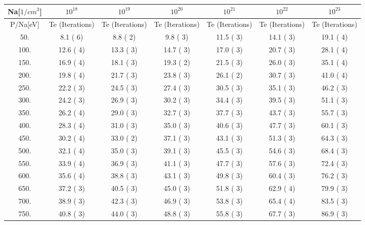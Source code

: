 \begin{tabular}{|c||c|c|c|c|c|c|}
\hline
Na[$1/cm^3$] & $10^{18}$ & $10^{19}$ & $10^{20}$ & $10^{21}$ & $10^{22}$ & $10^{23}$\tabularnewline
\hline
P/Na[eV] & Te (Iterations) &  Te (Iterations) &  Te (Iterations) &  Te (Iterations) &  Te (Iterations) &  Te (Iterations) \tabularnewline
\hline
\hline
   50. &     8.1 (      6) &     8.8 (      2) &     9.8 (      3) &    11.5 (      3) &    14.1 (      3) &    19.1 (      4)\tabularnewline
\hline
  100. &    12.6 (      4) &    13.3 (      3) &    14.7 (      3) &    17.0 (      3) &    20.7 (      3) &    28.1 (      4)\tabularnewline
\hline
  150. &    16.9 (      4) &    18.1 (      3) &    19.3 (      2) &    21.5 (      3) &    26.0 (      3) &    35.1 (      4)\tabularnewline
\hline
  200. &    19.8 (      4) &    21.7 (      3) &    23.8 (      3) &    26.1 (      2) &    30.7 (      3) &    41.0 (      4)\tabularnewline
\hline
  250. &    22.2 (      3) &    24.5 (      3) &    27.4 (      3) &    30.5 (      3) &    35.1 (      3) &    46.2 (      3)\tabularnewline
\hline
  300. &    24.2 (      3) &    26.9 (      3) &    30.2 (      3) &    34.4 (      3) &    39.5 (      3) &    51.1 (      3)\tabularnewline
\hline
  350. &    26.2 (      4) &    29.0 (      3) &    32.7 (      3) &    37.7 (      3) &    43.7 (      3) &    55.7 (      3)\tabularnewline
\hline
  400. &    28.3 (      4) &    31.0 (      3) &    35.0 (      3) &    40.6 (      3) &    47.7 (      3) &    60.1 (      3)\tabularnewline
\hline
  450. &    30.2 (      4) &    33.0 (      2) &    37.1 (      3) &    43.1 (      3) &    51.3 (      3) &    64.3 (      3)\tabularnewline
\hline
  500. &    32.1 (      4) &    35.0 (      3) &    39.1 (      3) &    45.5 (      3) &    54.6 (      3) &    68.4 (      3)\tabularnewline
\hline
  550. &    33.9 (      4) &    36.9 (      3) &    41.1 (      3) &    47.7 (      3) &    57.6 (      3) &    72.4 (      3)\tabularnewline
\hline
  600. &    35.6 (      4) &    38.8 (      3) &    43.1 (      3) &    49.8 (      3) &    60.4 (      3) &    76.2 (      3)\tabularnewline
\hline
  650. &    37.2 (      3) &    40.5 (      3) &    45.0 (      3) &    51.8 (      3) &    62.9 (      4) &    79.9 (      3)\tabularnewline
\hline
  700. &    38.9 (      3) &    42.3 (      3) &    46.9 (      3) &    53.8 (      3) &    65.4 (      4) &    83.5 (      3)\tabularnewline
\hline
  750. &    40.8 (      3) &    44.0 (      3) &    48.8 (      3) &    55.8 (      3) &    67.7 (      3) &    86.9 (      3)\tabularnewline

\end{tabular}
